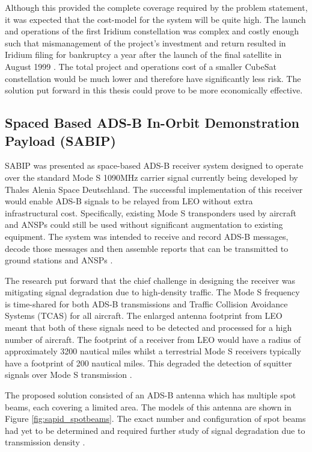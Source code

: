 Although this provided the complete coverage required by the problem statement, it was expected that the cost-model for the system will be quite high. The launch and operations of the first Iridium constellation was complex and costly enough such that mismanagement of the project's investment and return resulted in Iridium filing for bankruptcy a year after the launch of the final satellite in August 1999 \cite{Finkelstein2000}.   The total project and operations cost of a smaller CubeSat constellation would be much lower and therefore have significantly less risk. The solution put forward in this thesis could prove to be more economically effective.

\subsection{Spaced Based ADS-B In-Orbit Demonstration Payload (SABIP)} \label{sec:sadip}
SABIP was presented as space-based ADS-B receiver system designed to operate over the standard Mode S 1090MHz carrier signal currently being developed by Thales Alenia Space Deutschland. The successful implementation of this receiver would enable ADS-B signals to be relayed from LEO without extra infrastructural cost. Specifically, existing Mode S transponders used by aircraft and ANSPs could still be used without significant augmentation to existing equipment. The system was intended to receive and record ADS-B messages, decode those messages and then assemble reports that can be transmitted to ground stations and ANSPs \cite{Blomenhofer2012}. 

The research put forward that the chief challenge in designing the receiver was mitigating signal degradation due to high-density traffic. The Mode S frequency is time-shared for both ADS-B transmissions and Traffic Collision Avoidance Systems (TCAS) for all aircraft. The enlarged antenna footprint from LEO meant that both of these signals need to be detected and processed for a high number of aircraft. The footprint of a receiver from LEO would have a radius of approximately 3200 nautical miles whilst a terrestrial Mode S receivers typically have a footprint of 200 nautical miles. This degraded the detection of squitter signals over Mode S transmission \cite{Blomenhofer2012}. 

The proposed solution consisted of an ADS-B antenna which has multiple spot beams, each covering a limited area. The models of this antenna are shown in Figure \ref{fig:sapid_spotbeams}. The exact number and configuration of spot beams had yet to be determined and required further study of signal degradation due to transmission density \cite{Blomenhofer2012}.

